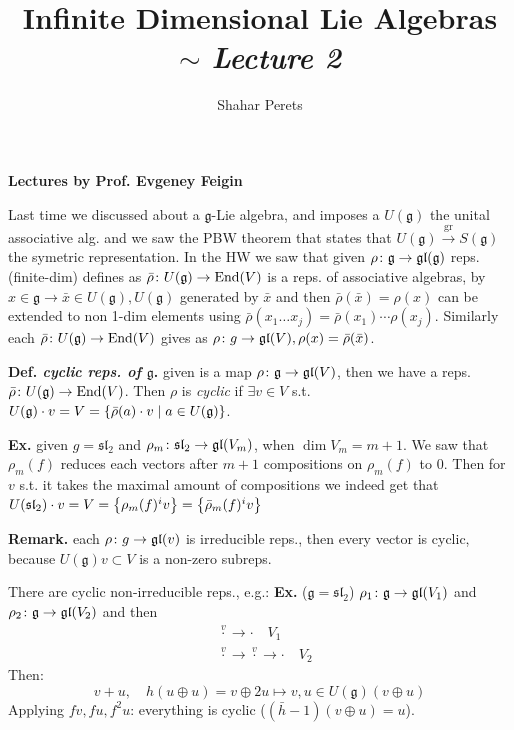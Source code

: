 \documentclass[]{../../../../tex/classes/styledArticle}
\author{Shahar Perets}
\title{Infinite Dimensional Lie Algebras $\sim$ \textit{Lecture 2}}
\newcommand\gl {\mathfrak{gl}}
\newcommand\g  {\mathfrak{g}}
\newcommand\Sl {\mathfrak{sl}}
\newcommand\gr {\mathrm{gr}}
\newcommand\End{\mathrm{End}}
\begin{document}
	\maketitle
	
	\textbf{Lectures by Prof. Evgeney Feigin}
	
	
	Last time we discussed about a $\g$-Lie algebra, and imposes a $U(\g)$ the unital associative alg. and we saw the PBW theorem that states that $U(\g) \overset{\gr}{\to}S(\g)$ the symetric representation. In the HW we saw that given $\rho \co \g \to \gl(\g)$ reps. (finite-dim) defines as $\bar \rho \co U(\g) \to \End(V)$ is a reps. of associative algebras, by $x \in \g \to \bar x \in U(\g), U(\g)$ generated by $\bar x$ and then $\bar \rho(\bar x) = \rho(x)$ can be extended to non 1-dim elements using $\bar\rho(x_1 \dots x_j) = \bar \rho(x_1) \cdots \rho(x_j)$. Similarly each $\bar\rho \co U(\g) \to \End(V)$ gives as $\rho \co g \to \gl(V), \rho(x) = \bar\rho(\bar x)$. 
	
	\textbf{Def. \textit{cyclic reps. of $\g$}. }given is a map $\rho \co \g \to \gl(V)$, then we have a reps. $\bar \rho \co U(\g) \to \End(V)$. Then $\rho$ is \textit{cyclic }if $\exists v \in V $ s.t. $U(\g) \cdot v = V = \ccb{\bar\rho(a) \cdot v \mid a \in U(\g)}$. 
	
	\textbf{Ex. }given $g = \Sl_2$ and $\rho_m \co \Sl_2 \to \gl(V_m)$, when $\dim V_m = m + 1$. We saw that $\rho_m(f)$ reduces each vectors after $m + 1$ compositions on $\rho_m(f)$ to $0$. Then for $v$ s.t. it takes the maximal amount of compositions we indeed get that $U(\Sl_2) \cdot v = V = \ccb{\rho_m(f)^{i}v} = \ccb{ \bar \rho_m(f)^{i}v}$ 
	
	
	\textbf{Remark. }each $\rho \co g \to \gl(v) $ is irreducible reps., then every vector is cyclic, because $U(\g)v \subset V$ is a non-zero subreps. 
	
	There are cyclic non-irreducible reps., e.g.: \textbf{Ex. }($\g = \Sl_2$) $\rho_1 \co \g \to \gl(V_1)$ and $\rho_2 \co \g \to \gl(V_2)$ and then 
	\begin{align*}
		&\overset{v}{\cdot}\to \cdot \quad V_1 \\
		&\overset{v}{\cdot} \to \overset{v}{\cdot} \to {\cdot} \quad V_2
	\end{align*}
	Then: 
	\[ v + u, \quad h(u \oplus u) = v \oplus 2u  \mapsto v, u \in U(\g)(v \oplus u) \]
	Applying $f v, fu , f^{2}u$: everything is cyclic ($(\bar h - 1)(v \oplus u) = u$). 
	
\end{document}
